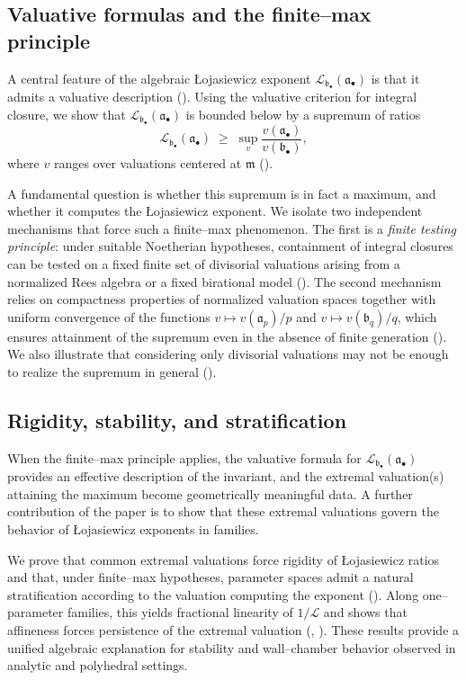 \documentclass[12pt]{amsart}
\newcommand{\m}{\mathfrak m}
\renewcommand{\a}{\mathfrak{a}}
\renewcommand{\b}{\mathfrak{b}}
\newcommand{\Loj}{\mathcal{L}} %
\newcommand{\abul}{{\a_\bullet}}
\newcommand{\bbul}{{\b_\bullet}}
\theoremstyle{plain}
\theoremstyle{definition}
\numberwithin{equation}{section}
\begin{document}
\subsection{Valuative formulas and the finite--max principle}

A central feature of the algebraic \L{}ojasiewicz exponent
$\Loj_{\bbul}(\abul)$ is that it admits a valuative description ().
Using the valuative criterion for integral closure, we show that
$\Loj_{\bbul}(\abul)$ is bounded below by a supremum of ratios
\[
\Loj_{\bbul}(\abul)
\;\ge\;
\sup_{v}\frac{v(\abul)}{v(\bbul)},
\]
where $v$ ranges over valuations centered at $\m$
().

A fundamental question is whether this supremum is in fact a maximum,
and whether it computes the \L{}ojasiewicz exponent.
We isolate two independent mechanisms that force such a finite--max phenomenon.
The first is a \emph{finite testing principle}: under suitable
Noetherian hypotheses, containment of integral closures can be tested
on a fixed finite set of divisorial valuations arising from a
normalized Rees algebra or a fixed birational model
().
The second mechanism relies on compactness properties of normalized
valuation spaces together with uniform convergence of the functions
$v\mapsto v(\a_p)/p$ and $v\mapsto v(\b_q)/q$, which ensures attainment
of the supremum even in the absence of finite generation
(). We also illustrate that considering only divisorial valuations may not be enough to realize the supremum in general ().

\subsection{Rigidity, stability, and stratification}

When the finite--max principle applies, the valuative formula for $\Loj_{\bbul}(\abul)$ provides an effective description of the invariant, and the extremal valuation(s) attaining the maximum become geometrically meaningful data.
A further contribution of the paper is to show that these extremal valuations govern the
behavior of \L{}ojasiewicz exponents in families.

We prove that common extremal valuations force rigidity of \L{}ojasiewicz ratios and that,
under finite--max hypotheses, parameter spaces admit a natural stratification according to
the valuation computing the exponent
().
Along one--parameter families, this yields fractional linearity of $1/\Loj$ and shows that
affineness forces persistence of the extremal valuation
(,
).
These results provide a unified algebraic explanation for stability and wall--chamber behavior
observed in analytic and polyhedral settings.
\end{document}
